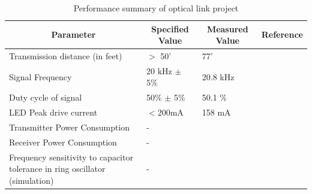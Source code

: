 \documentclass{article}
\begin{document}
\begin{table}[H]
	\centering
	\caption{Performance summary of optical link project}
	\label{tab:opticallink}
	\begin{tabular}{|l|l|l|l|}
		\hline
		\multicolumn{1}{|c|}{\textbf{Parameter}}                                     & \multicolumn{1}{c|}{\textbf{Specified Value}} & \multicolumn{1}{c|}{\textbf{Measured Value}} & \multicolumn{1}{c|}{\textbf{Reference}} \\ \hline
		Transmission distance (in feet)                                              & $>$ 50'                                       & 77'                                          &                                         \\ \hline
		Signal Frequency                                                             & 20 kHz $\pm$ 5\%                              & 20.8 kHz                                     &                                         \\ \hline
		Duty cycle of signal                                                         & 50\% $\pm$ 5\%                                & 50.1 \%                                      &                                         \\ \hline
		LED Peak drive current                                                       & $<$200mA                                      & 158 mA                                       &                                         \\ \hline
		Transmitter Power Consumption                                                & -                                             &                                              &                                         \\ \hline
		Receiver Power Consumption                                                   & -                                             &                                              &                                         \\ \hline
		Frequency sensitivity to capacitor tolerance in ring oscillator (simulation) & -                                             &                                              &                                         \\ \hline
	\end{tabular}
\end{table}
\end{document}
